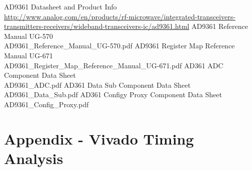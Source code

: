 \documentclass{article}
\begin{document}
 \begin{thebibliography}{1}

 AD9361 Datasheet and Product Info \\
\url{http://www.analog.com/en/products/rf-microwave/integrated-transceivers-transmitters-receivers/wideband-transceivers-ic/ad9361.html}
  AD9361 Reference Manual UG-570\\
 AD9361\_Reference\_Manual\_UG-570.pdf
  AD9361 Register Map Reference Manual UG-671\\
 AD9361\_Register\_Map\_Reference\_Manual\_UG-671.pdf
  AD361 ADC Component Data Sheet \\AD9361\_ADC.pdf
  AD361 Data Sub Component Data Sheet \\AD9361\_Data\_Sub.pdf
  AD361 Configy Proxy Component Data Sheet \\AD9361\_Config\_Proxy.pdf

 \end{thebibliography}

\pagebreak
\section{Appendix - Vivado Timing Analysis} \label{appendix}
\end{document}
